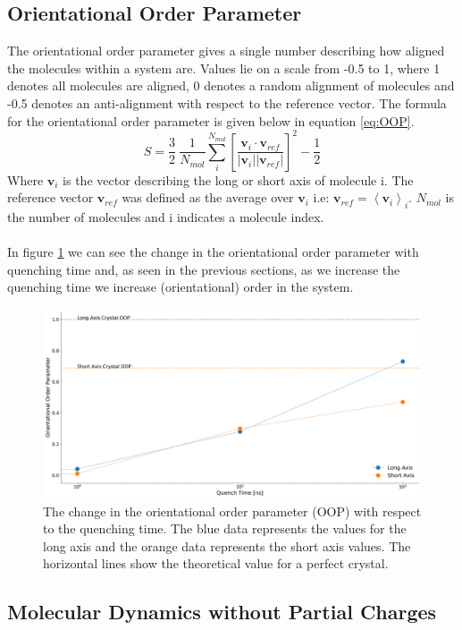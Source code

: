 \subsection{Orientational Order Parameter}
The orientational order parameter gives a single number describing how aligned the molecules within a system are. Values lie on a scale from -0.5 to 1, where 1 denotes all molecules are aligned, 0 denotes a random alignment of molecules and -0.5 denotes an anti-alignment with respect to the reference vector. The formula for the orientational order parameter is given below in equation \eqref{eq:OOP}.
\begin{equation}
	S = \frac{3}{2} \ \frac{1}{N_{mol}}\sum_{i}^{N_{mol}} \left[\frac{\mathbf{v}_{i} \cdot \mathbf{v}_{ref}}{|\mathbf{v}_{i}| |\mathbf{v}_{ref}|} \right]^{2}  - \frac{1}{2}
	\label{eq:OOP}
\end{equation}
Where $\mathbf{v}_{i}$ is the vector describing the long or short axis of molecule i. The reference vector $\mathbf{v}_{ref}$ was defined as the average over $\mathbf{v}_{i}$ i.e: $\mathbf{v}_{ref} = \left\langle \mathbf{v}_{i} \right\rangle_{i}$. $N_{mol}$ is the number of molecules and i indicates a molecule index.
\\\\
In figure \ref{fig:OOP} we can see the change in the orientational order parameter with quenching time and, as seen in the previous sections, as we increase the quenching time we increase (orientational) order in the system.
\begin{figure}[h]
	\includegraphics[width=\textwidth]{./img/DifferentQuenchTimes/TimevsOOP.png}
	\caption{\label{fig:OOP}The change in the orientational order parameter (OOP) with respect to the quenching time. The blue data represents the values for the long axis and the orange data represents the short axis values. The horizontal lines show the theoretical value for a perfect crystal.}
\end{figure}


\subsection{Molecular Dynamics without Partial Charges}


\label{sect:partial_charge_importance}

